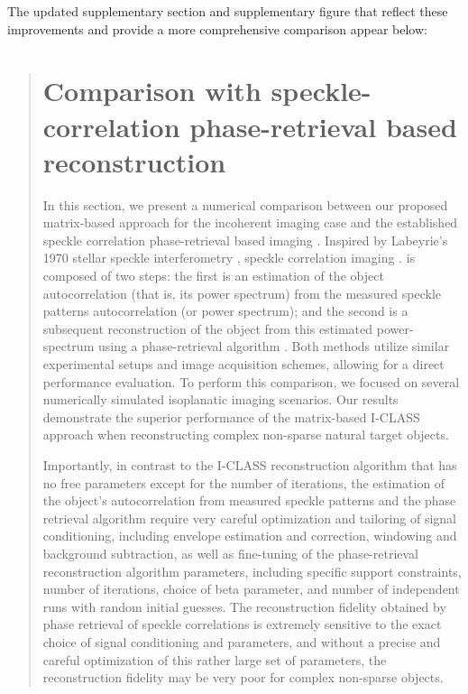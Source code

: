 \documentclass[12pt]{article}
\newenvironment{ourresponse}
    {\begin{tcolorbox}[width=\linewidth,breakable,enhanced,colback=gray!5,colframe=responsecolor!50,title=Response,left=5pt,right=5pt]}
    {\end{tcolorbox}}
\begin{document}
\begin{ourresponse}
     The updated supplementary section and supplementary figure that reflect these improvements and provide a more comprehensive comparison appear below:

    \begin{quote}
        \section*{Comparison with speckle-correlation phase-retrieval based reconstruction}

        In this section, we present a numerical comparison between our proposed matrix-based approach for the incoherent imaging case and the established speckle correlation phase-retrieval based imaging  \cite{bert12, katz14}. Inspired by Labeyrie's 1970 stellar speckle interferometry \cite{labeyrie1970attainment}, speckle correlation imaging \cite{bert12, katz14}. is composed of two steps: the first is an estimation of the object autocorrelation (that is, its power spectrum) from the measured speckle patterns autocorrelation (or power spectrum); and the second is a subsequent reconstruction of the object from this estimated power-spectrum using a phase-retrieval algorithm \cite{fienup1982phase}. 
        Both methods utilize similar experimental setups and image acquisition schemes, allowing for a direct performance evaluation. To perform this comparison, we focused on several numerically simulated isoplanatic imaging scenarios. Our results demonstrate the superior performance of the matrix-based I-CLASS approach when reconstructing complex non-sparse natural target objects. 
        
        Importantly, in contrast to the I-CLASS reconstruction algorithm that has no free parameters except for the number of iterations, the estimation of the object's autocorrelation from measured speckle patterns and the phase retrieval algorithm require very careful optimization and tailoring of signal conditioning, including envelope estimation and correction, windowing and background subtraction, as well as fine-tuning of the phase-retrieval reconstruction algorithm parameters, including specific support constraints, number of iterations, choice of beta parameter, and number of independent runs with random initial guesses. The reconstruction fidelity obtained by phase retrieval of speckle correlations is extremely sensitive to the exact choice of signal conditioning and parameters, and without a precise and careful optimization of this rather large set of parameters, the reconstruction fidelity may be very poor for complex non-sparse objects. 


\end{quote}
\end{ourresponse}
\end{document}
